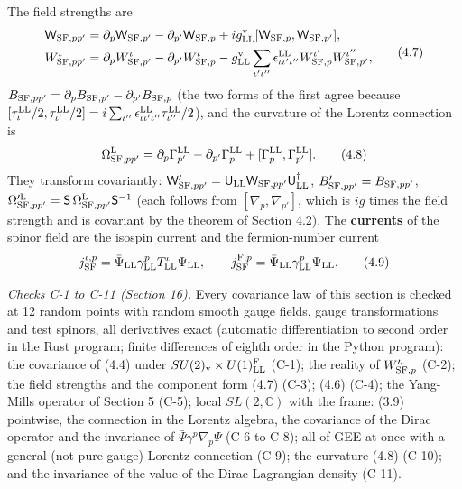 \documentclass[
  10pt,
]{article}
\begin{document}
The field strengths are
\[\begin{aligned}\mathsf W_{{\rm SF},pp'}&=\partial_p\mathsf W_{{\rm SF},p'}-\partial_{p'}\mathsf W_{{\rm SF},p}+ig^{\rm v}_{\rm LL}[\mathsf W_{{\rm SF},p},\mathsf W_{{\rm SF},p'}],\\W^\iota_{{\rm SF},pp'}&=\partial_pW^\iota_{{\rm SF},p'}-\partial_{p'}W^\iota_{{\rm SF},p}-g^{\rm v}_{\rm LL}\sum_{\iota'\iota''}\epsilon^{\rm LL}_{\iota\iota'\iota''}W^{\iota'}_{{\rm SF},p}W^{\iota''}_{{\rm SF},p'},\end{aligned}\tag{4.7}\]
\(B_{{\rm SF},pp'}=\partial_pB_{{\rm SF},p'}-\partial_{p'}B_{{\rm SF},p}\)
(the two forms of the first agree because
\([\tau^{\rm LL}_\iota/2,\tau^{\rm LL}_{\iota'}/2]=i\sum_{\iota''}\epsilon^{\rm LL}_{\iota\iota'\iota''}\tau^{\rm LL}_{\iota''}/2\)),
and the curvature of the Lorentz connection is
\[\Omega^{\rm L}_{{\rm SF},pp'}=\partial_p\Gamma^{\rm LL}_{p'}-\partial_{p'}\Gamma^{\rm LL}_p+[\Gamma^{\rm LL}_p,\Gamma^{\rm LL}_{p'}].\tag{4.8}\]
They transform covariantly:
\(\mathsf W'_{{\rm SF},pp'}=\mathsf U_{\rm LL}\mathsf W_{{\rm SF},pp'}\mathsf U_{\rm LL}^\dagger\),
\(B'_{{\rm SF},pp'}=B_{{\rm SF},pp'}\),
\(\Omega'^{\rm L}_{{\rm SF},pp'}=\mathsf S\,\Omega^{\rm L}_{{\rm SF},pp'}\mathsf S^{-1}\)
(each follows from \([\nabla_p,\nabla_{p'}]\), which is \(ig\) times the
field strength and is covariant by the theorem of Section 4.2). The
\textbf{currents} of the spinor field are the isospin current and the
fermion-number current
\[j^{\iota,p}_{\rm SF}=\bar\Psi_{\rm LL}\gamma^p_{\rm LL}T^\iota_{\rm LL}\Psi_{\rm LL},\qquad j^{{\rm F},p}_{\rm SF}=\bar\Psi_{\rm LL}\gamma^p_{\rm LL}\Psi_{\rm LL}.\tag{4.9}\]

\emph{Checks C-1 to C-11 (Section 16).} Every covariance law of this
section is checked at 12 random points with random smooth gauge fields,
gauge transformations and test spinors, all derivatives exact (automatic
differentiation to second order in the Rust program; finite differences
of eighth order in the Python program): the covariance of (4.4) under
\(SU(2)_{\rm v}\times U(1)^{\rm F}_{\rm LL}\) (C-1); the reality of
\(W'^\iota_{{\rm SF},p}\) (C-2); the field strengths and the component
form (4.7) (C-3); (4.6) (C-4); the Yang-Mills operator of Section 5
(C-5); local \(SL(2,\mathbb C)\) with the frame: (3.9) pointwise, the
connection in the Lorentz algebra, the covariance of the Dirac operator
and the invariance of \(\bar\Psi\gamma^p\nabla_p\Psi\) (C-6 to C-8); all
of GEE at once with a general (not pure-gauge) Lorentz connection (C-9);
the curvature (4.8) (C-10); and the invariance of the value of the Dirac
Lagrangian density (C-11).
\end{document}
